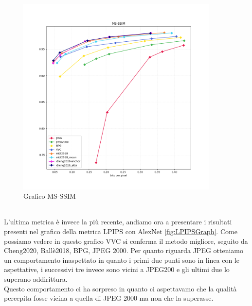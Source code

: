 \begin{figure}[!h]
    \centering
    \includegraphics[width=0.9\textwidth]{Immagini/METRICS/MS-SSIM.png}
    \caption{Grafico MS-SSIM}
    \label{fig:MSSSIMGraph}
\end{figure}\\
L’ultima metrica è invece la più recente, andiamo ora a presentare i risultati presenti nel grafico della metrica LPIPS con AlexNet \ref{fig:LPIPSGraph}. Come possiamo vedere in questo grafico VVC si conferma il metodo migliore, seguito da Cheng2020, Ballè2018, BPG, JPEG 2000. Per quanto riguarda JPEG otteniamo un comportamento inaspettato in quanto i primi due punti sono in linea con le aspettative, i successivi tre invece sono vicini a JPEG200 e gli ultimi due lo superano addirittura.\\
Questo comportamento ci ha sorpreso in quanto ci aspettavamo che la qualità percepita fosse vicina a quella di JPEG 2000 ma non che la superasse.\\
